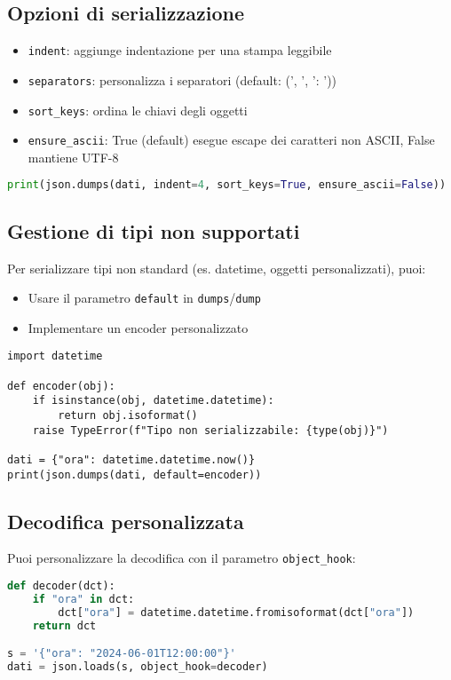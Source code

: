 \documentclass[a4paper,12pt]{article}
\begin{document}
\subsection*{Opzioni di serializzazione}
\begin{itemize}
    \item \texttt{indent}: aggiunge indentazione per una stampa leggibile
    \item \texttt{separators}: personalizza i separatori (default: (', ', ': '))
    \item \texttt{sort\_keys}: ordina le chiavi degli oggetti
    \item \texttt{ensure\_ascii}: True (default) esegue escape dei caratteri non ASCII, False mantiene UTF-8
\end{itemize}
\begin{lstlisting}[language=Python, basicstyle=\ttfamily\footnotesize, breaklines=true, frame=single]
print(json.dumps(dati, indent=4, sort_keys=True, ensure_ascii=False))
\end{lstlisting}

\subsection*{Gestione di tipi non supportati}
Per serializzare tipi non standard (es. datetime, oggetti personalizzati), puoi:
\begin{itemize}
    \item Usare il parametro \texttt{default} in \texttt{dumps}/\texttt{dump}
    \item Implementare un encoder personalizzato
\end{itemize}
\begin{lstlisting}
import datetime

def encoder(obj):
    if isinstance(obj, datetime.datetime):
        return obj.isoformat()
    raise TypeError(f"Tipo non serializzabile: {type(obj)}")

dati = {"ora": datetime.datetime.now()}
print(json.dumps(dati, default=encoder))
\end{lstlisting}

\subsection*{Decodifica personalizzata}
Puoi personalizzare la decodifica con il parametro \texttt{object\_hook}:
\begin{lstlisting}[language=Python, basicstyle=\ttfamily\footnotesize, breaklines=true, frame=single]
def decoder(dct):
    if "ora" in dct:
        dct["ora"] = datetime.datetime.fromisoformat(dct["ora"])
    return dct

s = '{"ora": "2024-06-01T12:00:00"}'
dati = json.loads(s, object_hook=decoder)
\end{lstlisting}
\end{document}
